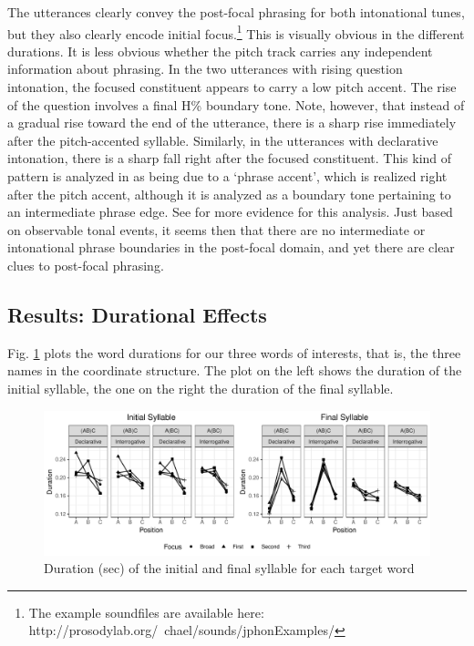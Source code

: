 \documentclass[preprint,review,12pt,authoryear,times]{elsarticle}
\begin{document}
The utterances clearly convey the post-focal phrasing for both intonational tunes, but they also clearly encode initial focus.\footnote{The example soundfiles are available here: http://prosodylab.org/~chael/sounds/jphonExamples/} This is visually obvious in the different durations. It is less obvious whether the pitch track carries any independent information about phrasing. In the two utterances with rising question intonation, the focused constituent appears to carry a low pitch accent. The rise of the question involves a final H\% boundary tone. Note, however, that instead of a gradual rise toward the end of the utterance, there is a sharp  rise  immediately after the pitch-accented syllable. Similarly, in the utterances with declarative intonation, there is a sharp fall right after the focused constituent. This kind of pattern is analyzed in \citet{pierr80} as being due to a `phrase accent', which is realized right after the pitch accent, although it is analyzed as a boundary tone pertaining to an intermediate phrase edge.   See \citep{grice00} for more evidence for this analysis. Just based on observable tonal events, it seems then that there are no intermediate or intonational phrase boundaries in the post-focal domain, and yet there are clear clues to post-focal phrasing. 


\subsection{Results: Durational Effects}

Fig. \ref{figureDuration} plots the word durations for our three words of interests, that is, the three names in the coordinate structure. The plot on the left  shows the duration of the initial syllable, the one on the right the duration of the final syllable. 

\begin{figure}[ht!]
	\begin{center}
		\includegraphics[width=5.4in]{Figures/syllable_duration.pdf}
		\caption{Duration (sec) of the initial and final syllable for each target word}
		\label{figureDuration}
	\end{center} 
\end{figure}
\end{document}
